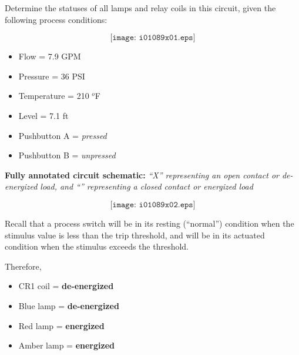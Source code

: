 

Determine the statuses of all lamps and relay coils in this circuit, given the following process conditions:

$$\texttt{[image: i01089x01.eps]}$$

\begin{itemize}
\item{} Flow = 7.9 GPM
\item{} Pressure = 36 PSI
\item{} Temperature = 210 $^{o}$F
\item{} Level = 7.1 ft
\item{} Pushbutton A = {\it pressed}
\item{} Pushbutton B = {\it unpressed}
\end{itemize}







\noindent
{\bf Fully annotated circuit schematic:}  {\it ``X'' representing an open contact or de-energized load, and ``'' representing a closed contact or energized load}

$$\texttt{[image: i01089x02.eps]}$$

Recall that a process switch will be in its resting (``normal'') condition when the stimulus value is less than the trip threshold, and will be in its actuated condition when the stimulus exceeds the threshold.

\vskip 10pt

Therefore,
 
\begin{itemize}
\item{} CR1 coil = {\bf de-energized}
\item{} Blue lamp = {\bf de-energized}
\item{} Red lamp = {\bf energized}
\item{} Amber lamp = {\bf energized} 
\end{itemize}










